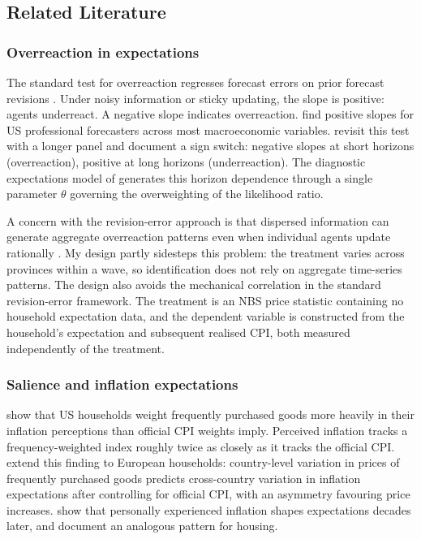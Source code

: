 \subsection{Related Literature}\label{sec:literature}

\subsubsection{Overreaction in expectations}

The standard test for overreaction regresses forecast errors
on prior forecast revisions \citep{Coibion2015}.
Under noisy information or sticky updating, the slope is
positive: agents underreact.
A negative slope indicates overreaction.
\citet{Coibion2015} find positive slopes for US professional
forecasters across most macroeconomic variables.
\citet{Bordalo2020b} revisit this test with a longer panel
and document a sign switch: negative slopes at short horizons
(overreaction), positive at long horizons (underreaction).
The diagnostic expectations model of \citet{Bordalo2018}
generates this horizon dependence through a single parameter
$\theta$ governing the overweighting of the likelihood ratio.

A concern with the revision-error approach is that dispersed
information can generate aggregate overreaction patterns even
when individual agents update rationally
\citep{Angeletos2021}.
My design partly sidesteps this problem: the treatment varies
across provinces within a wave, so identification does not
rely on aggregate time-series patterns.
The design also avoids the mechanical correlation in the
standard revision-error framework.
The treatment is an NBS price statistic containing no
household expectation data, and the dependent variable is
constructed from the household's expectation and subsequent
realised CPI, both measured independently of the treatment.

\subsubsection{Salience and inflation expectations}

\citet{Cavallo2017} show that US households weight frequently
purchased goods more heavily in their inflation perceptions
than official CPI weights imply.
Perceived inflation tracks a frequency-weighted index roughly
twice as closely as it tracks the official CPI.
\citet{DacuntoHoangPirolliWeber2021} extend this finding to
European households: country-level variation in prices of
frequently purchased goods predicts cross-country variation
in inflation expectations after controlling for official CPI,
with an asymmetry favouring price increases.
\citet{Malmendier2016} show that personally experienced
inflation shapes expectations decades later, and
\citet{Kuchler2019} document an analogous pattern for housing.

